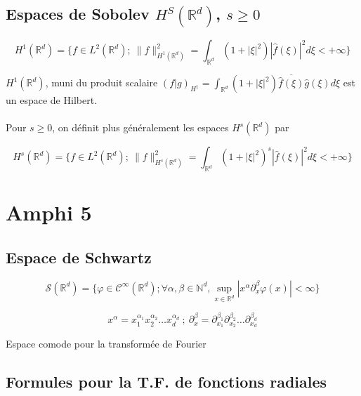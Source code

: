 \documentclass[10pt,a4paper,oneside]{article}
\begin{document}
\subsection{Espaces de Sobolev $H^S(\mathbb{R}^d)$, $s \geq 0$}

\[ H^1(\mathbb{R}^d) = \{ f \in L^2(\mathbb{R}^d);\ \| f \|^2_{H^1(\mathbb{R}^d)} = \int_{\mathbb{R}^d} (1 + |\xi|^2) |\hat{f}(\xi)|^2 d\xi < +\infty \} \]

$H^1(\mathbb{R}^d)$, muni du produit scalaire $(f | g)_{H^1} = \int_{\mathbb{R}^d} (1 + |\xi|^2) \overline{\hat{f}(\xi)} \hat{g}(\xi) d\xi$ est un espace de Hilbert.
\\ \\
Pour $s \geq 0$, on définit plus généralement les espaces $H^s(\mathbb{R}^d)$ par

\[ H^s(\mathbb{R}^d) = \{ f \in L^2(\mathbb{R}^d);\ \| f \|^2_{H^s(\mathbb{R}^d)} = \int_{\mathbb{R}^d} (1 + |\xi|^2)^s |\hat{f}(\xi)|^2 d\xi < +\infty\} \]

\section{Amphi 5}

\subsection{Espace de Schwartz}

\[ \mathcal{S}(\mathbb{R}^d) = \{ \varphi \in \mathcal{C}^\infty(\mathbb{R}^d); \forall \alpha, \beta \in \mathbb{N}^d, \sup_{x \in \mathbb{R}^d} |x^\alpha \partial^\beta_x \varphi(x)| < \infty \} \]

\[ x^\alpha = x_1^{\alpha_1} x_2^{\alpha_2} \ldots x_d^{\alpha_d}\ ;\ \partial^\beta_x = \partial^{\beta_1}_{x_1} \partial^{\beta_2}_{x_2} \ldots \partial^{\beta_d}_{x_d} \]

Espace comode pour la transformée de Fourier

\subsection{Formules pour la T.F. de fonctions radiales}
\end{document}
